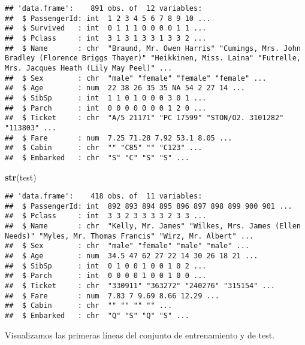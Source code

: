 \documentclass[
]{article}
\newenvironment{Shaded}{\begin{snugshade}}{\end{snugshade}}
\newcommand{\DataTypeTok}[1]{\textcolor[rgb]{0.13,0.29,0.53}{#1}}
\newcommand{\KeywordTok}[1]{\textcolor[rgb]{0.13,0.29,0.53}{\textbf{#1}}}
\newcommand{\NormalTok}[1]{#1}
\newcommand{\OperatorTok}[1]{\textcolor[rgb]{0.81,0.36,0.00}{\textbf{#1}}}
\newcommand{\StringTok}[1]{\textcolor[rgb]{0.31,0.60,0.02}{#1}}
\begin{document}
\begin{verbatim}
## 'data.frame':    891 obs. of  12 variables:
##  $ PassengerId: int  1 2 3 4 5 6 7 8 9 10 ...
##  $ Survived   : int  0 1 1 1 0 0 0 0 1 1 ...
##  $ Pclass     : int  3 1 3 1 3 3 1 3 3 2 ...
##  $ Name       : chr  "Braund, Mr. Owen Harris" "Cumings, Mrs. John Bradley (Florence Briggs Thayer)" "Heikkinen, Miss. Laina" "Futrelle, Mrs. Jacques Heath (Lily May Peel)" ...
##  $ Sex        : chr  "male" "female" "female" "female" ...
##  $ Age        : num  22 38 26 35 35 NA 54 2 27 14 ...
##  $ SibSp      : int  1 1 0 1 0 0 0 3 0 1 ...
##  $ Parch      : int  0 0 0 0 0 0 0 1 2 0 ...
##  $ Ticket     : chr  "A/5 21171" "PC 17599" "STON/O2. 3101282" "113803" ...
##  $ Fare       : num  7.25 71.28 7.92 53.1 8.05 ...
##  $ Cabin      : chr  "" "C85" "" "C123" ...
##  $ Embarked   : chr  "S" "C" "S" "S" ...
\end{verbatim}

\begin{Shaded}
\begin{Highlighting}[]
\KeywordTok{str}\NormalTok{(test)}
\end{Highlighting}
\end{Shaded}

\begin{verbatim}
## 'data.frame':    418 obs. of  11 variables:
##  $ PassengerId: int  892 893 894 895 896 897 898 899 900 901 ...
##  $ Pclass     : int  3 3 2 3 3 3 3 2 3 3 ...
##  $ Name       : chr  "Kelly, Mr. James" "Wilkes, Mrs. James (Ellen Needs)" "Myles, Mr. Thomas Francis" "Wirz, Mr. Albert" ...
##  $ Sex        : chr  "male" "female" "male" "male" ...
##  $ Age        : num  34.5 47 62 27 22 14 30 26 18 21 ...
##  $ SibSp      : int  0 1 0 0 1 0 0 1 0 2 ...
##  $ Parch      : int  0 0 0 0 1 0 0 1 0 0 ...
##  $ Ticket     : chr  "330911" "363272" "240276" "315154" ...
##  $ Fare       : num  7.83 7 9.69 8.66 12.29 ...
##  $ Cabin      : chr  "" "" "" "" ...
##  $ Embarked   : chr  "Q" "S" "Q" "S" ...
\end{verbatim}

\texttt{}

Visualizamos las primeras líneas del conjunto de entrenamiento y de
test.

\texttt{}

\begin{Shaded}
\end{Shaded}
\end{document}

